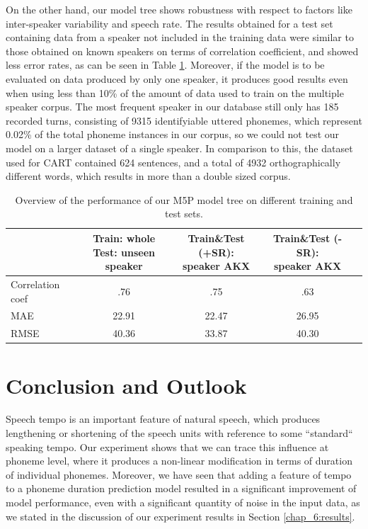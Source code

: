 \documentclass[11pt,a4paper]{scrbook}
\begin{document}
On the other hand, our model tree shows robustness with respect to factors like inter-speaker variability and speech rate. The results obtained for a test set containing data from a speaker not included in the training data were similar to those obtained on known speakers on terms of correlation coefficient, and showed less error rates, as can be seen in Table \ref{tab:perfM5P}. Moreover, if the model is to be evaluated on data produced by only one speaker, it produces good results even when using less than 10\% of the amount of data used to train on the multiple speaker corpus. The most frequent speaker in our database still only has 185 recorded turns, consisting of 9315 identifyiable uttered phonemes, which represent 0.02\% of the total phoneme instances in our corpus, so we could not test our model on a larger dataset of a single speaker. In comparison to this, the dataset used for CART contained 624 sentences, and a total of 4932 orthographically different words, which results in more than a double sized corpus.

\begin{table}[htbp]
\centering
\begin{tabular}{|l|c|c|c|c|}

\hline
	 & \shortstack{Train: whole \\ Test: unseen speaker} & \shortstack{Train\&Test (+SR): \\ speaker AKX} & \shortstack{Train\&Test (-SR): \\ speaker AKX} \\ 
\hline
\hline
Correlation coef 		& .76   & .75 & .63 \\
	\hline
MAE  &  22.91 & 22.47 & 26.95 \\
	\hline
RMSE  &  40.36 & 33.87 & 40.30 \\
	\hline

\end{tabular}
\vspace{4mm}
\caption{Overview of the performance of our M5P model tree on different training and test sets.} 
\label{tab:perfM5P}
\end{table}

\chapter{Conclusion and Outlook}
Speech tempo is an important feature of natural speech, which produces lengthening or shortening of the speech units with reference to some ``standard`` speaking tempo. Our experiment shows that we can trace this influence at phoneme level, where it produces a non-linear modification in terms of duration of individual phonemes. Moreover, we have seen that adding a feature of tempo to a phoneme duration prediction model resulted in a significant improvement of model performance, even with a significant quantity of noise in the input data, as we stated in the discussion of our experiment results in Section \ref{chap_6:results}. 
\end{document}

